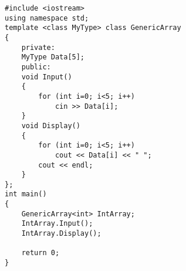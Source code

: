 \documentclass[12pt,a4paper]{article}
\begin{document}
\begin{lstlisting}[caption={Class template}]
#include <iostream>
using namespace std;
template <class MyType> class GenericArray
{
	private:
	MyType Data[5];
	public:
	void Input()
	{
		for (int i=0; i<5; i++)
			cin >> Data[i];
	}
	void Display()
	{
		for (int i=0; i<5; i++)
			cout << Data[i] << " ";
		cout << endl;
	}
};
int main()
{
	GenericArray<int> IntArray;
	IntArray.Input();
	IntArray.Display();
	
	return 0;
}
\end{lstlisting}


\end{document}

